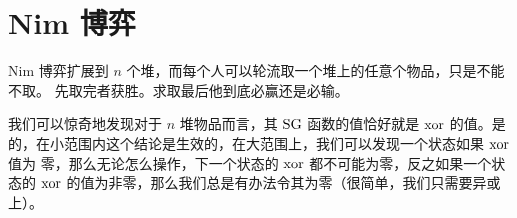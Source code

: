 \section{Nim 博弈}
Nim 博弈扩展到 $n$ 个堆，而每个人可以轮流取一个堆上的任意个物品，只是不能不取。
先取完者获胜。求取最后他到底必赢还是必输。

我们可以惊奇地发现对于 $n$ 堆物品而言，其 $\mathrm{SG}$ 函数的值恰好就是 $\mathrm{xor}$ 的值。是
的，在小范围内这个结论是生效的，在大范围上，我们可以发现一个状态如果 $\mathrm{xor}$ 值为
零，那么无论怎么操作，下一个状态的 $\mathrm{xor}$ 都不可能为零，反之如果一个状态的
$\mathrm{xor}$ 的值为非零，那么我们总是有办法令其为零（很简单，我们只需要异或上）。


